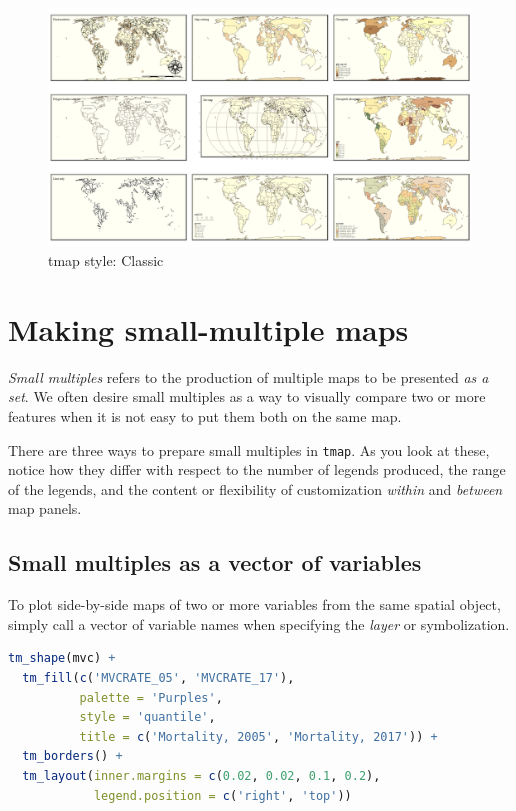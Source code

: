 \documentclass[
]{book}
\newcommand{\passthrough}[1]{#1}
\begin{document}
\begin{figure}
\includegraphics[width=0.5\linewidth]{images/classic} \caption{tmap style: Classic}\label{fig:unnamed-chunk-295}
\end{figure}

\hypertarget{making-small-multiple-maps}{%
\section{Making small-multiple maps}\label{making-small-multiple-maps}}

\emph{Small multiples} refers to the production of multiple maps to be presented \emph{as a set}. We often desire small multiples as a way to visually compare two or more features when it is not easy to put them both on the same map.

There are three ways to prepare small multiples in \passthrough{\lstinline!tmap!}. As you look at these, notice how they differ with respect to the number of legends produced, the range of the legends, and the content or flexibility of customization \emph{within} and \emph{between} map panels.

\hypertarget{small-multiples-as-a-vector-of-variables}{%
\subsection{Small multiples as a vector of variables}\label{small-multiples-as-a-vector-of-variables}}

To plot side-by-side maps of two or more variables from the same spatial object, simply call a vector of variable names when specifying the \emph{layer} or symbolization.

\begin{lstlisting}[language=R]
tm_shape(mvc) + 
  tm_fill(c('MVCRATE_05', 'MVCRATE_17'),
          palette = 'Purples',
          style = 'quantile',
          title = c('Mortality, 2005', 'Mortality, 2017')) +
  tm_borders() +
  tm_layout(inner.margins = c(0.02, 0.02, 0.1, 0.2),
            legend.position = c('right', 'top'))
\end{lstlisting}
\end{document}
